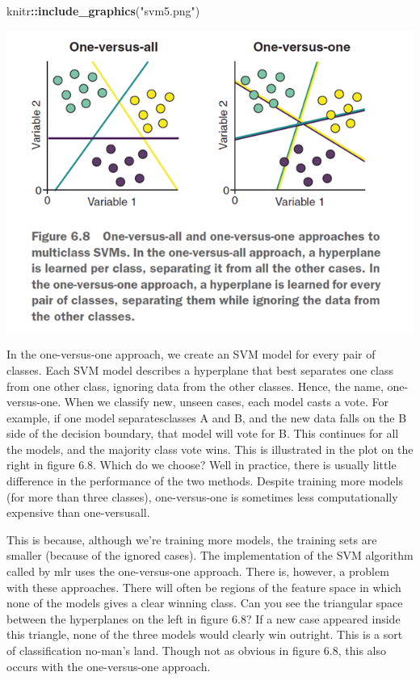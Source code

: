 \documentclass[
]{article}
\newenvironment{Shaded}{\begin{snugshade}}{\end{snugshade}}
\newcommand{\FunctionTok}[1]{\textcolor[rgb]{0.13,0.29,0.53}{\textbf{#1}}}
\newcommand{\NormalTok}[1]{#1}
\newcommand{\SpecialCharTok}[1]{\textcolor[rgb]{0.81,0.36,0.00}{\textbf{#1}}}
\newcommand{\StringTok}[1]{\textcolor[rgb]{0.31,0.60,0.02}{#1}}
\begin{document}
\begin{Shaded}
\begin{Highlighting}[]
\NormalTok{knitr}\SpecialCharTok{::}\FunctionTok{include\_graphics}\NormalTok{(}\StringTok{"svm5.png"}\NormalTok{)}
\end{Highlighting}
\end{Shaded}

\includegraphics[width=8.67in]{svm5}

In the one-versus-one approach, we create an SVM model for every pair of
classes. Each SVM model describes a hyperplane that best separates one
class from one other class, ignoring data from the other classes. Hence,
the name, one-versus-one. When we classify new, unseen cases, each model
casts a vote. For example, if one model separatesclasses A and B, and
the new data falls on the B side of the decision boundary, that model
will vote for B. This continues for all the models, and the majority
class vote wins. This is illustrated in the plot on the right in figure
6.8. Which do we choose? Well in practice, there is usually little
difference in the performance of the two methods. Despite training more
models (for more than three classes), one-versus-one is sometimes less
computationally expensive than one-versusall.

This is because, although we're training more models, the training sets
are smaller (because of the ignored cases). The implementation of the
SVM algorithm called by mlr uses the one-versus-one approach. There is,
however, a problem with these approaches. There will often be regions of
the feature space in which none of the models gives a clear winning
class. Can you see the triangular space between the hyperplanes on the
left in figure 6.8? If a new case appeared inside this triangle, none of
the three models would clearly win outright. This is a sort of
classification no-man's land. Though not as obvious in figure 6.8, this
also occurs with the one-versus-one approach.
\end{document}
